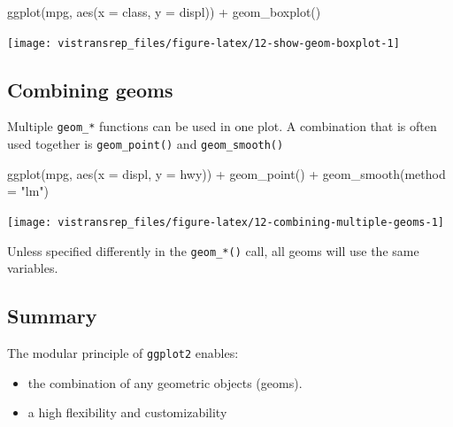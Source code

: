 \documentclass[]{book}
\newenvironment{Shaded}{}{}
\newcommand{\DataTypeTok}[1]{#1}
\newcommand{\KeywordTok}[1]{\textcolor[rgb]{0.00,0.00,1.00}{#1}}
\newcommand{\NormalTok}[1]{#1}
\newcommand{\OperatorTok}[1]{#1}
\newcommand{\StringTok}[1]{\textcolor[rgb]{0.00,0.50,0.50}{#1}}
\providecommand{\tightlist}{%
  \setlength{\itemsep}{0pt}\setlength{\parskip}{0pt}}
\begin{document}
\begin{Shaded}
\begin{Highlighting}[]
\KeywordTok{ggplot}\NormalTok{(mpg, }\KeywordTok{aes}\NormalTok{(}\DataTypeTok{x =}\NormalTok{ class, }\DataTypeTok{y =}\NormalTok{ displ)) }\OperatorTok{+}
\StringTok{  }\KeywordTok{geom_boxplot}\NormalTok{()}
\end{Highlighting}
\end{Shaded}

\begin{flushright}\texttt{[image: vistransrep\_files/figure-latex/12-show-geom-boxplot-1]} \end{flushright}

\hypertarget{combining-geoms}{%
\subsection{Combining geoms}\label{combining-geoms}}

Multiple \texttt{geom\_*} functions can be used in one plot.
A combination that is often used together is \texttt{geom\_point()} and \texttt{geom\_smooth()}

\begin{Shaded}
\begin{Highlighting}[]
\KeywordTok{ggplot}\NormalTok{(mpg, }\KeywordTok{aes}\NormalTok{(}\DataTypeTok{x =}\NormalTok{ displ, }\DataTypeTok{y =}\NormalTok{ hwy)) }\OperatorTok{+}
\StringTok{  }\KeywordTok{geom_point}\NormalTok{() }\OperatorTok{+}
\StringTok{  }\KeywordTok{geom_smooth}\NormalTok{(}\DataTypeTok{method =} \StringTok{"lm"}\NormalTok{)}
\end{Highlighting}
\end{Shaded}

\begin{flushright}\texttt{[image: vistransrep\_files/figure-latex/12-combining-multiple-geoms-1]} \end{flushright}

Unless specified differently in the \texttt{geom\_*()} call, all geoms will use the same variables.

\hypertarget{summary}{%
\subsection{Summary}\label{summary}}

The modular principle of \texttt{ggplot2} enables:

\begin{itemize}
\tightlist
\item
  the combination of any geometric objects (geoms).
\item
  a high flexibility and customizability
\end{itemize}
\end{document}
